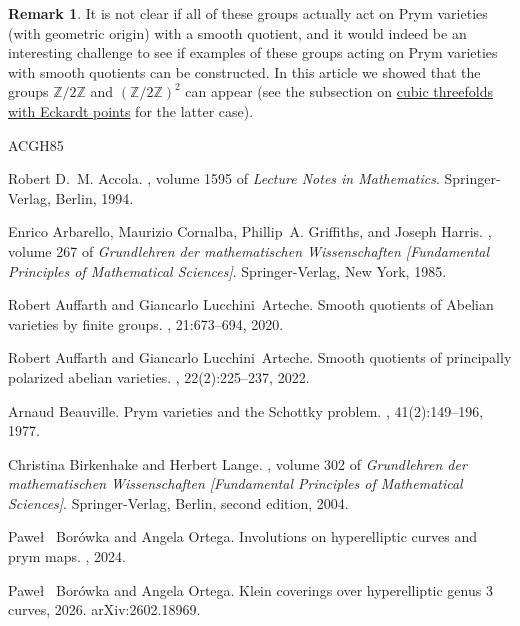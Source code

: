 \documentclass[preprint,12pt]{amsart}
\def\bZ{\ensuremath{\mathbb{Z}}}
\theoremstyle{plain}
\theoremstyle{definition}
\newtheorem{rem}[rem]{Remark}
\begin{document}
\begin{rem}
It is not clear if all of these groups actually act on Prym varieties (with geometric origin) with a smooth quotient, and it would indeed be an interesting challenge to see if examples of these groups acting on Prym varieties with smooth quotients can be constructed.
In this article we showed that the groups $\bZ/2\bZ$ and $(\bZ/2\bZ)^2$ can appear (see the subsection on \hyperref[Eckardt]{cubic threefolds with Eckardt points} for the latter case).
\end{rem}

\begin{thebibliography}{ACGH85}

Robert D.~M. Accola.
, volume 1595 of {\em
  Lecture Notes in Mathematics}.
\newblock Springer-Verlag, Berlin, 1994.

Enrico Arbarello, Maurizio Cornalba, Phillip~A. Griffiths, and Joseph Harris.
, volume 267 of {\em
  Grundlehren der mathematischen Wissenschaften [Fundamental Principles of
  Mathematical Sciences]}.
\newblock Springer-Verlag, New York, 1985.

Robert Auffarth and Giancarlo Lucchini~Arteche.
\newblock Smooth quotients of {A}belian varieties by finite groups.
, 21:673--694, 2020.

Robert Auffarth and Giancarlo Lucchini~Arteche.
\newblock Smooth quotients of principally polarized abelian varieties.
, 22(2):225--237, 2022.

Arnaud Beauville.
\newblock Prym varieties and the {S}chottky problem.
, 41(2):149--196, 1977.

Christina Birkenhake and Herbert Lange.
, volume 302 of {\em Grundlehren der
  mathematischen Wissenschaften [Fundamental Principles of Mathematical
  Sciences]}.
\newblock Springer-Verlag, Berlin, second edition, 2004.

Pawe\l~ Bor\'owka and Angela Ortega.
\newblock Involutions on hyperelliptic curves and prym maps.
, 2024.

Pawe\l~ Bor\'owka and Angela Ortega.
\newblock Klein coverings over hyperelliptic genus 3 curves, 2026.
\newblock arXiv:2602.18969.


\end{thebibliography}
\end{document}
